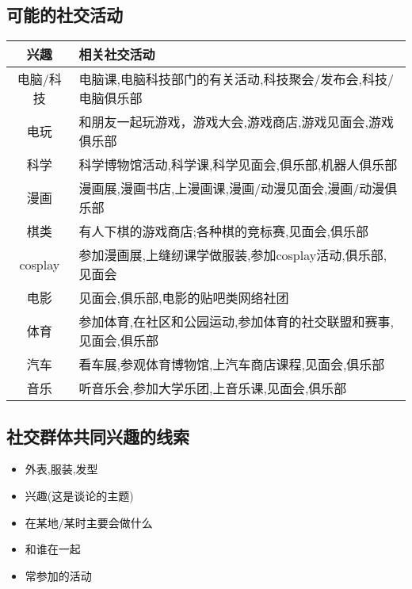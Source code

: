 \documentclass[UTF8]{article}
\newcommand{\indList}{\vspace{-6pt}}
\begin{document}
\subsection{可能的社交活动}
\indList
\begin{center}
\begin{tabular}{c|l}
\textbf{兴趣}&\textbf{相关社交活动}\\ \hline
电脑/科技&电脑课,电脑科技部门的有关活动,科技聚会/发布会,科技/电脑俱乐部\\
电玩&和朋友一起玩游戏，游戏大会,游戏商店,游戏见面会,游戏俱乐部\\
科学&科学博物馆活动,科学课,科学见面会,俱乐部,机器人俱乐部\\
漫画&漫画展,漫画书店,上漫画课,漫画/动漫见面会,漫画/动漫俱乐部\\
棋类&有人下棋的游戏商店;各种棋的竞标赛,见面会,俱乐部\\
cosplay&参加漫画展,上缝纫课学做服装,参加cosplay活动,俱乐部,见面会\\
电影&见面会,俱乐部,电影的贴吧类网络社团\\
体育&参加体育,在社区和公园运动,参加体育的社交联盟和赛事,见面会,俱乐部\\
汽车&看车展,参观体育博物馆,上汽车商店课程,见面会,俱乐部\\
音乐&听音乐会,参加大学乐团,上音乐课,见面会,俱乐部\\
\end{tabular}
\end{center}
\indList\indList

\subsection{社交群体共同兴趣的线索}
\indList
\begin{itemize}
    \item 外表,服装,发型
    \item 兴趣(这是谈论的主题)
    \item 在某地/某时主要会做什么
    \item 和谁在一起
    \item 常参加的活动
\end{itemize}
\indList
\end{document}

